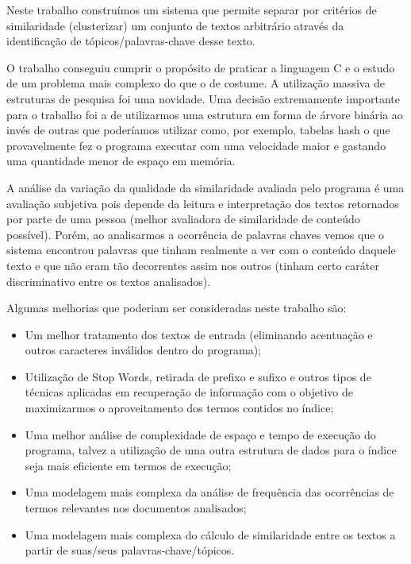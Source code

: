 \documentclass[12pt]{article}
\begin{document}
Neste trabalho construímos um sistema que permite separar por critérios de similaridade
(clusterizar) um conjunto de textos arbitrário através da identificação de 
tópicos/palavras-chave desse texto.

O trabalho conseguiu cumprir o propósito de praticar a linguagem C e o estudo de um 
problema mais complexo do que o de costume. A utilização massiva de estruturas de pesquisa
foi uma novidade. Uma decisão extremamente importante para o trabalho foi a de utilizarmos 
uma estrutura em forma de árvore binária ao invés de outras que poderíamos utilizar como,
por exemplo, tabelas hash o que provavelmente fez o programa executar com uma velocidade 
maior e gastando uma quantidade menor de espaço em memória.

A análise da variação da qualidade da similaridade avaliada pelo programa é uma avaliação 
subjetiva pois depende da leitura e interpretação dos textos retornados por parte de uma
pessoa (melhor avaliadora de similaridade de conteúdo possível). Porém, ao analisarmos a 
ocorrência de palavras chaves vemos que o sistema encontrou palavras que tinham realmente 
a ver com o conteúdo daquele texto e que não eram tão decorrentes assim nos outros (tinham 
certo caráter discriminativo entre os textos analisados).

Algumas melhorias que poderiam ser consideradas neste trabalho são:
\begin{itemize}
\item Um melhor tratamento dos textos de entrada (eliminando acentuação e outros 
caracteres inválidos dentro do programa);
\item Utilização de Stop Words, retirada de prefixo e sufixo e outros tipos de técnicas
aplicadas em recuperação de informação com o objetivo de maximizarmos o aproveitamento dos
termos contidos no índice;
\item Uma melhor análise de complexidade de espaço e tempo de execução do programa, talvez
a utilização de uma outra estrutura de dados para o índice seja mais eficiente em termos 
de execução;
\item Uma modelagem mais complexa da análise de frequência das ocorrências de termos 
relevantes nos documentos analisados;
\item Uma modelagem mais complexa do cálculo de similaridade entre os textos a partir de 
suas/seus palavras-chave/tópicos.
\end{itemize}
\end{document}
